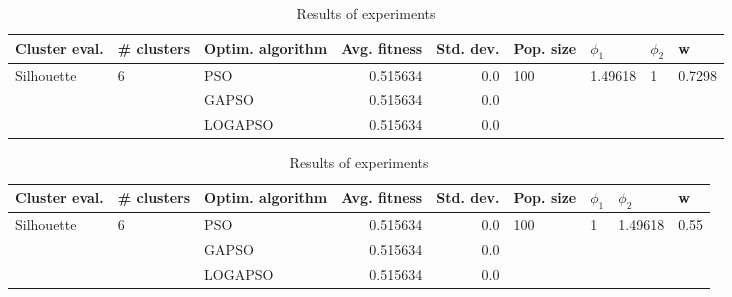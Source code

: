 \documentclass{article}
\begin{document}
\begin{table}
\centering
\caption{Results of experiments}
\begin{tabular}{lllrrllll}
\toprule
              Cluster eval. &        \# clusters & Optim. algorithm &  Avg. fitness &  Std. dev. &            Pop. size &               $\phi_{1}$ &         $\phi_{2}$ &                       w \\
\midrule
\multirow{3}{*}{Silhouette} & \multirow{3}{*}{6} &              PSO &      0.515634 &        0.0 & \multirow{3}{*}{100} & \multirow{3}{*}{1.49618} & \multirow{3}{*}{1} & \multirow{3}{*}{0.7298} \\
                            &                    &            GAPSO &      0.515634 &        0.0 &                      &                          &                    &                         \\
                            &                    &          LOGAPSO &      0.515634 &        0.0 &                      &                          &                    &                         \\
\bottomrule
\end{tabular}
\end{table}
\begin{table}
\centering
\caption{Results of experiments}
\begin{tabular}{lllrrllll}
\toprule
              Cluster eval. &        \# clusters & Optim. algorithm &  Avg. fitness &  Std. dev. &            Pop. size &         $\phi_{1}$ &               $\phi_{2}$ &                     w \\
\midrule
\multirow{3}{*}{Silhouette} & \multirow{3}{*}{6} &              PSO &      0.515634 &        0.0 & \multirow{3}{*}{100} & \multirow{3}{*}{1} & \multirow{3}{*}{1.49618} & \multirow{3}{*}{0.55} \\
                            &                    &            GAPSO &      0.515634 &        0.0 &                      &                    &                          &                       \\
                            &                    &          LOGAPSO &      0.515634 &        0.0 &                      &                    &                          &                       \\
\bottomrule
\end{tabular}
\end{table}
\end{document}
